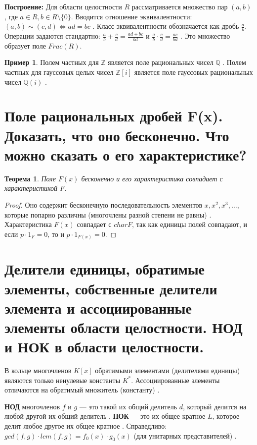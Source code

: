 \documentclass[12pt, a4paper]{article}
\theoremstyle{definition}
\newtheorem{example}{Пример}[section]
\theoremstyle{plain}
\newtheorem{theorem}{Теорема}[section]
\begin{document}
	\textbf{Построение:} Для области целостности $R$ рассматривается множество пар $(a, b)$, где $a \in R, b \in R \setminus \{0\}$. Вводится отношение эквивалентности: $(a,b) \sim (c,d) \iff ad=bc$ . Класс эквивалентности обозначается как дробь $\frac{a}{b}$. Операции задаются стандартно: $\frac{a}{b} + \frac{c}{d} = \frac{ad+bc}{bd}$ и $\frac{a}{b} \cdot \frac{c}{d} = \frac{ac}{bd}$ . Это множество образует поле $Frac(R)$.
	
	\begin{example}
		Полем частных для $\mathbb{Z}$ является поле рациональных чисел $\mathbb{Q}$ . Полем частных для гауссовых целых чисел $\mathbb{Z}[i]$ является поле гауссовых рациональных чисел $\mathbb{Q}(i)$ .
	\end{example}
	
	\newpage
	
	\section{Поле рациональных дробей F(x). Доказать, что оно бесконечно. Что можно сказать о его характеристике?}
	
	\begin{theorem}
		Поле $F(x)$ бесконечно и его характеристика совпадает с характеристикой $F$.
	\end{theorem}
	\begin{proof}
		Оно содержит бесконечную последовательность элементов $x, x^2, x^3, \dots$, которые попарно различны (многочлены разной степени не равны) . Характеристика $F(x)$ совпадает с $char F$, так как единицы полей совпадают, и если $p \cdot 1_F = 0$, то и $p \cdot 1_{F(x)} = 0$.
	\end{proof}
	
	\newpage
	
	\section{Делители единицы, обратимые элементы, собственные делители элемента и ассоциированные элементы области целостности. НОД и НОК в области целостности.}
	
	В кольце многочленов $K[x]$ обратимыми элементами (делителями единицы) являются только ненулевые константы $K^*$. Ассоциированные элементы отличаются на обратимый множитель (константу) .
	
	\textbf{НОД} многочленов $f$ и $g$ — это такой их общий делитель $d$, который делится на любой другой их общий делитель . 
	\textbf{НОК} — это их общее кратное $L$, которое делит любое другое их общее кратное .
	Справедливо: $gcd(f,g) \cdot lcm(f,g) = f_0(x) \cdot g_0(x)$ (для унитарных представителей) .
	
\end{document}
